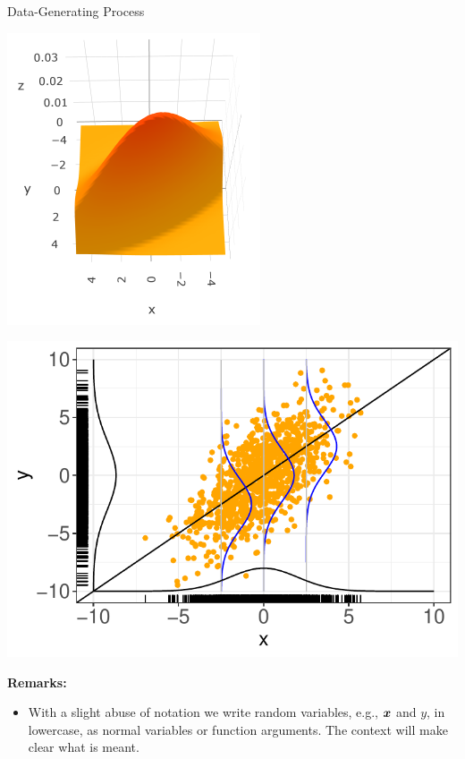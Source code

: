 \begin{vbframe}{Data-Generating Process}
\begin{minipage}{0.5\textwidth}
  \centering
  \includegraphics[width = 0.7\linewidth]{figure/sample-dgp-3d.png}
\end{minipage}%
\begin{minipage}{0.5\textwidth}
  \includegraphics[width = 0.9\linewidth]{figure/sample-dgp-2d.pdf}
\end{minipage}

\framebreak

\textbf{Remarks:}

\begin{itemize}

  \item With a slight abuse of notation we write random variables, e.g., $\bm{x}$ 
  and $y$, in lowercase, as normal variables or function arguments. The context 
  will make clear what is meant.
  

\end{itemize}
\end{vbframe}
